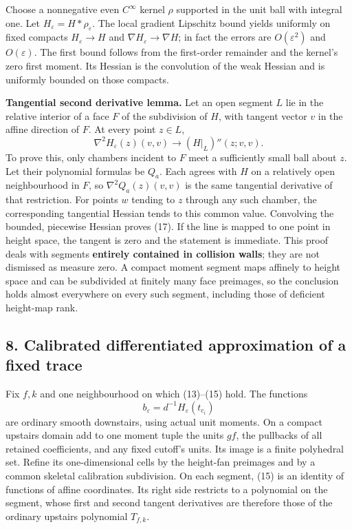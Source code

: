 \documentclass[
  11pt,
]{article}
\begin{document}
Choose a nonnegative even \(C^\infty\) kernel \(\rho\) supported in the
unit ball with integral one. Let \(H_\varepsilon=H*\rho_\varepsilon\).
The local gradient Lipschitz bound yields uniformly on fixed compacts
\(H_\varepsilon\to H\) and \(\nabla H_\varepsilon\to\nabla H\); in fact
the errors are \(O(\varepsilon^2)\) and \(O(\varepsilon)\). The first
bound follows from the first-order remainder and the kernel's zero first
moment. Its Hessian is the convolution of the weak Hessian and is
uniformly bounded on those compacts.

\textbf{Tangential second derivative lemma.} Let an open segment \(L\)
lie in the relative interior of a face \(F\) of the subdivision of
\(H\), with tangent vector \(v\) in the affine direction of \(F\). At
every point \(z\in L\), \[
        \nabla^2H_\varepsilon(z)(v,v)
                  \longrightarrow (H|_L)''(z;v,v).       \tag{17}
\] To prove this, only chambers incident to \(F\) meet a sufficiently
small ball about \(z\). Let their polynomial formulas be \(Q_a\). Each
agrees with \(H\) on a relatively open neighbourhood in \(F\), so
\(\nabla^2Q_a(z)(v,v)\) is the same tangential derivative of that
restriction. For points \(w\) tending to \(z\) through any such chamber,
the corresponding tangential Hessian tends to this common value.
Convolving the bounded, piecewise Hessian proves (17). If the line is
mapped to one point in height space, the tangent is zero and the
statement is immediate. This proof deals with segments \textbf{entirely
contained in collision walls}; they are not dismissed as measure zero. A
compact moment segment maps affinely to height space and can be
subdivided at finitely many face preimages, so the conclusion holds
almost everywhere on every such segment, including those of deficient
height-map rank.

\subsection{8. Calibrated differentiated approximation of a fixed
trace}\label{calibrated-differentiated-approximation-of-a-fixed-trace}

Fix \(f,k\) and one neighbourhood on which (13)--(15) hold. The
functions \[
                b_\varepsilon=d^{-1}H_\varepsilon(t_{c_i})
                                                               \tag{18}
\] are ordinary smooth downstairs, using actual unit moments. On a
compact upstairs domain add to one moment tuple the units \(gf\), the
pullbacks of all retained coefficients, and any fixed cutoff's units.
Its image is a finite polyhedral set. Refine its one-dimensional cells
by the height-fan preimages and by a common skeletal calibration
subdivision. On each segment, (15) is an identity of functions of affine
coordinates. Its right side restricts to a polynomial on the segment,
whose first and second tangent derivatives are therefore those of the
ordinary upstairs polynomial \(T_{f,k}\).
\end{document}
